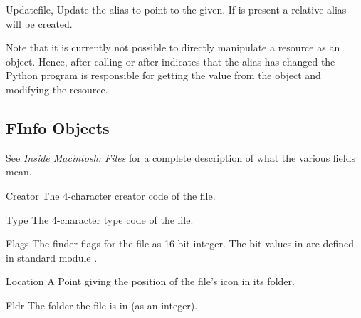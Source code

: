 \begin{methoddesc}[Alias]{Update}{file, }
Update the alias to point to the  given. If  is
present a relative alias will be created.
\end{methoddesc}

Note that it is currently not possible to directly manipulate a
resource as an  object. Hence, after calling
 or after  indicates that the alias
has changed the Python program is responsible for getting the
 value from the  object and modifying the
resource.


\subsection{FInfo Objects}
\label{finfo-objects}

See \emph{Inside Macintosh: Files} for a complete description of what
the various fields mean.

\begin{memberdesc}[FInfo]{Creator}
The 4-character creator code of the file.
\end{memberdesc}

\begin{memberdesc}[FInfo]{Type}
The 4-character type code of the file.
\end{memberdesc}

\begin{memberdesc}[FInfo]{Flags}
The finder flags for the file as 16-bit integer. The bit values in
 are defined in standard module .
\end{memberdesc}

\begin{memberdesc}[FInfo]{Location}
A Point giving the position of the file's icon in its folder.
\end{memberdesc}

\begin{memberdesc}[FInfo]{Fldr}
The folder the file is in (as an integer).
\end{memberdesc}
